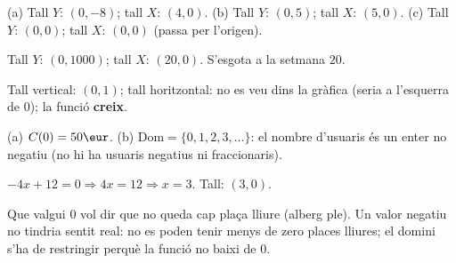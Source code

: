 \begin{solucions}
\begin{sollist}
  \item (a) Tall $Y$: $(0,-8)$; tall $X$: $(4,0)$. \quad
        (b) Tall $Y$: $(0,5)$; tall $X$: $(5,0)$. \quad
        (c) Tall $Y$: $(0,0)$; tall $X$: $(0,0)$ (passa per l'origen).
  \item Tall $Y$: $(0,1000)$; tall $X$: $(20,0)$. S'esgota a la setmana $20$.
  \item Tall vertical: $(0,1)$; tall horitzontal: no es veu dins la gràfica (seria a
        l'esquerra de $0$); la funció \textbf{creix}.
  \item (a) $C(0)=50\eur$. \quad (b) $\mathrm{Dom}=\{0,1,2,3,\dots\}$: el nombre
        d'usuaris és un enter no negatiu (no hi ha usuaris negatius ni fraccionaris).
  \item $-4x+12=0 \Rightarrow 4x=12 \Rightarrow x=3$. Tall: $(3,0)$.
  \item Que valgui $0$ vol dir que no queda cap plaça lliure (alberg ple). Un valor
        negatiu no tindria sentit real: no es poden tenir menys de zero places lliures;
        el domini s'ha de restringir perquè la funció no baixi de $0$.
\end{sollist}
\end{solucions}
